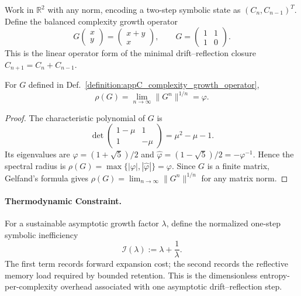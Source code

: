 \begin{definition}
\label{definition:appC_complexity_growth_operator}
Work in $\mathbb{R}^2$ with any norm, encoding a two-step symbolic state
as $(C_n,C_{n-1})^T$. Define the balanced complexity growth operator
\[
G\begin{pmatrix}x\\y\end{pmatrix}
=\begin{pmatrix}x+y\\x\end{pmatrix},
\qquad
G=\begin{pmatrix}1&1\\1&0\end{pmatrix}.
\]
This is the linear operator form of the minimal drift--reflection closure
$C_{n+1}=C_n+C_{n-1}$.
\end{definition}

\begin{theorem}
\label{theorem:appC_phi_as_spectral_radius}
For $G$ defined in Def.~\ref{definition:appC_complexity_growth_operator},
\[
\rho(G)=\lim_{n \to \infty} \|G^n\|^{1/n} = \varphi .
\]
\end{theorem}

\begin{proof}
\label{proof:appC_phi_as_spectral_radius}
The characteristic polynomial of $G$ is
\[
\det\!\begin{pmatrix}1-\mu&1\\1&-\mu\end{pmatrix}
=\mu^2-\mu-1.
\]
Its eigenvalues are $\varphi=(1+\sqrt5)/2$ and
$\widehat\varphi=(1-\sqrt5)/2=-\varphi^{-1}$. Hence the spectral radius is
$\rho(G)=\max\{|\varphi|,|\widehat\varphi|\}=\varphi$. Since $G$ is a finite
matrix, Gelfand's formula gives $\rho(G)=\lim_{n\to\infty}\|G^n\|^{1/n}$ for any
matrix norm.
\end{proof}

\paragraph{Thermodynamic Constraint.}
\label{paragraph:appC_entropic_efficiency_and_thermodynamic_link}

\begin{definition}
\label{definition:appC_complexity_entropy_tradeof}
For a sustainable asymptotic growth factor $\lambda$, define the normalized
one-step symbolic inefficiency
\[
\mathcal{I}(\lambda):=\lambda+\frac{1}{\lambda}.
\]
The first term records forward expansion cost; the second records the reflective
memory load required by bounded retention. This is the dimensionless
entropy-per-complexity overhead associated with one asymptotic drift--reflection
step.
\end{definition}

